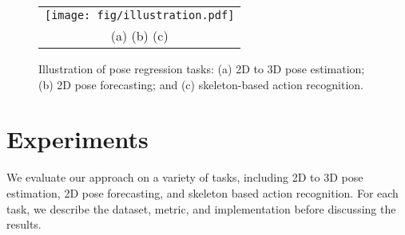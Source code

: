 \documentclass{article}
\begin{document}
 \begin{figure}
\centering
\begin{tabular}{c}
\texttt{[image: fig/illustration.pdf]}\vspace{-0.3cm}\\
(a) \hspace{1.5in} (b) \hspace{1.5in} (c)\\
\end{tabular}
\vspace{-0.3cm}
\caption{
Illustration of  pose regression tasks: (a) 2D to 3D pose estimation;
(b) 2D pose forecasting; and (c)  skeleton-based action recognition.} 
\label{fig:task_ill}
\vspace{-0.4cm}
\end{figure} \section{Experiments}
\label{sec:exp}
{
We evaluate our approach on a variety of tasks, including 2D to 3D pose estimation, 2D pose forecasting, and skeleton based action recognition. For each task, we describe the dataset, metric, and implementation before discussing the results.
}
\end{document}

